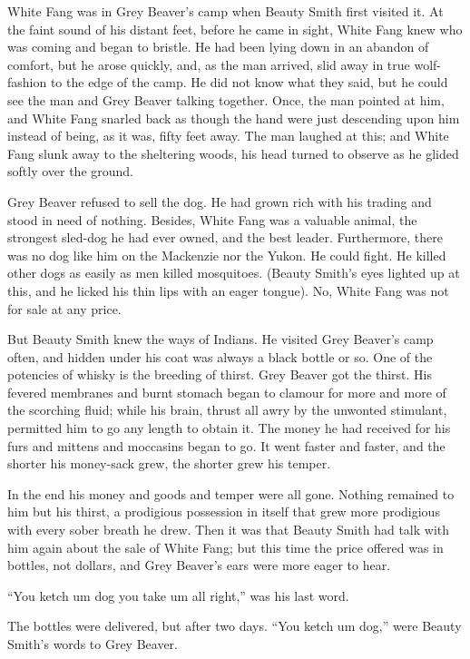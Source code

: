 \documentclass[10pt]{book}
\begin{document}
White Fang was in Grey Beaver’s camp when Beauty Smith first visited
it. At the faint sound of his distant feet, before he came in sight,
White Fang knew who was coming and began to bristle. He had been lying
down in an abandon of comfort, but he arose quickly, and, as the man
arrived, slid away in true wolf-fashion to the edge of the camp. He did
not know what they said, but he could see the man and Grey Beaver
talking together. Once, the man pointed at him, and White Fang snarled
back as though the hand were just descending upon him instead of being,
as it was, fifty feet away. The man laughed at this; and White Fang
slunk away to the sheltering woods, his head turned to observe as he
glided softly over the ground.

Grey Beaver refused to sell the dog. He had grown rich with his trading
and stood in need of nothing. Besides, White Fang was a valuable
animal, the strongest sled-dog he had ever owned, and the best leader.
Furthermore, there was no dog like him on the Mackenzie nor the Yukon.
He could fight. He killed other dogs as easily as men killed
mosquitoes. (Beauty Smith’s eyes lighted up at this, and he licked his
thin lips with an eager tongue). No, White Fang was not for sale at any
price.

But Beauty Smith knew the ways of Indians. He visited Grey Beaver’s
camp often, and hidden under his coat was always a black bottle or so.
One of the potencies of whisky is the breeding of thirst. Grey Beaver
got the thirst. His fevered membranes and burnt stomach began to
clamour for more and more of the scorching fluid; while his brain,
thrust all awry by the unwonted stimulant, permitted him to go any
length to obtain it. The money he had received for his furs and mittens
and moccasins began to go. It went faster and faster, and the shorter
his money-sack grew, the shorter grew his temper.

In the end his money and goods and temper were all gone. Nothing
remained to him but his thirst, a prodigious possession in itself that
grew more prodigious with every sober breath he drew. Then it was that
Beauty Smith had talk with him again about the sale of White Fang; but
this time the price offered was in bottles, not dollars, and Grey
Beaver’s ears were more eager to hear.

“You ketch um dog you take um all right,” was his last word.

The bottles were delivered, but after two days. “You ketch um dog,”
were Beauty Smith’s words to Grey Beaver.
\end{document}

